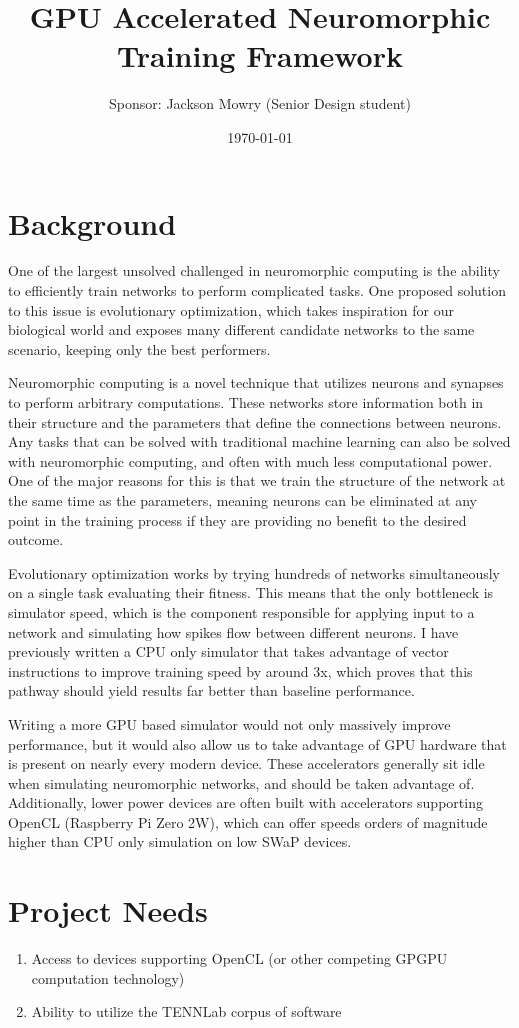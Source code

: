 \documentclass[11pt]{article}
\author{Sponsor: Jackson Mowry (Senior Design student)}
\date{\today}
\title{GPU Accelerated Neuromorphic Training Framework}
\begin{document}
\maketitle
\tableofcontents

\section{Background}
\label{sec:org9771868}
One of the largest unsolved challenged in neuromorphic computing is the ability to efficiently train networks to perform complicated tasks. One proposed solution to this issue is evolutionary optimization, which takes inspiration for our biological world and exposes many different candidate networks to the same scenario, keeping only the best performers.

Neuromorphic computing is a novel technique that utilizes neurons and synapses to perform arbitrary computations. These networks store information both in their structure and the parameters that define the connections between neurons. Any tasks that can be solved with traditional machine learning can also be solved with neuromorphic computing, and often with much less computational power. One of the major reasons for this is that we train the structure of the network at the same time as the parameters, meaning neurons can be eliminated at any point in the training process if they are providing no benefit to the desired outcome.

Evolutionary optimization works by trying hundreds of networks simultaneously on a single task evaluating their fitness. This means that the only bottleneck is simulator speed, which is the component responsible for applying input to a network and simulating how spikes flow between different neurons. I have previously written a CPU only simulator that takes advantage of vector instructions to improve training speed by around 3x, which proves that this pathway should yield results far better than baseline performance.

Writing a more GPU based simulator would not only massively improve performance, but it would also allow us to take advantage of GPU hardware that is present on nearly every modern device. These accelerators generally sit idle when simulating neuromorphic networks, and should be taken advantage of. Additionally, lower power devices are often built with accelerators supporting OpenCL (Raspberry Pi Zero 2W), which can offer speeds orders of magnitude higher than CPU only simulation on low SWaP devices.
\section{Project Needs}
\label{sec:org84cd3d4}
\begin{enumerate}
\item Access to devices supporting OpenCL (or other competing GPGPU computation technology)
\item Ability to utilize the TENNLab corpus of software
\end{enumerate}
\end{document}
